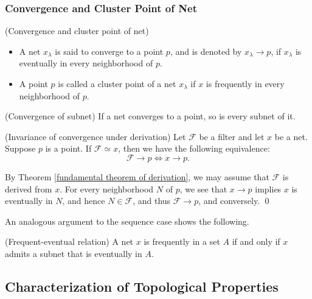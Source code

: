 \documentclass{report}
\begin{document}
\subsubsection{Convergence and Cluster Point of Net}
\begin{dfn} (Convergence and cluster point of net)
    \begin{itemize}
        \item A net \( x_{\lambda} \) is said to converge to a point \( p \), and is denoted by \( x_{\lambda}\to p \), if \( x_{\lambda} \) is eventually in every neighborhood of \( p \).
        \item A point \( p \) is called a cluster point of a net \( x_{\lambda} \) if \( x \) is frequently in every neighborhood of \( p \).
    \end{itemize}
\end{dfn}

\begin{exe} (Convergence of subnet)
    If a net converges to a point, so is every subnet of it.
\end{exe}

\begin{thm}\label{invariance convergence} (Invariance of convergence under derivation)
    Let \( \mathscr{F} \) be a filter and let \( x \) be a net. Suppose \( p \) is a point. If \( \mathscr{F} \simeq x \), then we have the following equivalence:
    \[
        \mathscr{F} \to p \iff x \to p.
    \]
\end{thm}
\begin{prf}
    By Theorem \ref{fundamental theorem of derivation}, we may assume that \( \mathscr{F} \) is derived from \( x \). For every neighborhood \( N \) of \( p \), we see that \( x \to p \) implies \( x \) is eventually in \( N \), and hence \( N \in \mathscr{F} \), and thus \( \mathscr{F}\to p \), and conversely.
    \qed\end{prf}

An analogous argument to the sequence case shows the following.
\begin{exe}\label{fe relation} (Frequent-eventual relation)
    A net \( x \) is frequently in a set \( A \) if and only if \( x \) admits a subnet that is eventually in \( A \).
\end{exe}

\subsection{Characterization of Topological Properties}
\end{document}
